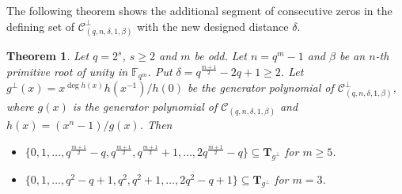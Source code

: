 \documentclass[10pt,a4paper]{amsart}
\newtheorem{theorem}{Theorem}
\begin{document}
The following theorem shows the additional segment of consecutive zeros in the defining set of $\mathcal{C}_{(q,n,\delta,1,\beta)}^\perp$ with the new designed distance $\delta$.

\begin{theorem}
	\label{4 small delta}
	Let $q=2^s$, $s\ge 2$ and $m$ be odd. Let $n=q^m-1$ and $\beta$ be an $n$-th primitive root of unity in $\mathbb{F}_{q^m}$. Put $\delta=q^{\frac{m+1}{2}}-2q+1\ge2$. Let $g^\perp(x)=x^{\deg h(x)}h(x^{-1})/h(0)$ be the generator polynomial of $\mathcal{C}_{(q,n,\delta,1,\beta)}^\perp$, where $g(x)$ is the generator polynomial of $\mathcal{C}_{(q,n,\delta,1,\beta)}$ and $h(x)=(x^n-1)/g(x)$. Then
	\begin{itemize}
		\item $\{0,1,\dots,q^\frac{m+1}{2}-q,q^\frac{m+1}{2},q^\frac{m+1}{2}+1,\dots,2q^\frac{m+1}{2}-q\}\subseteq \textbf{T}_{g^\perp}$ for $m\ge5$.
		\item $\{0,1,\dots,q^2-q+1,q^2,q^2+1,\dots,2q^2-q+1\}\subseteq \textbf{T}_{g^\perp}$ for $m=3$.
	\end{itemize}
\end{theorem}
\end{document}
